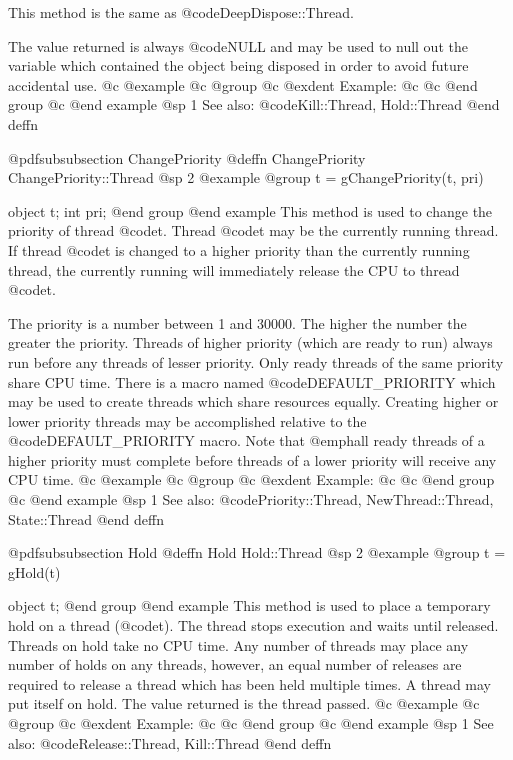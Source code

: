 This method is the same as @code{DeepDispose::Thread}.

The value returned is always @code{NULL} and may be used to null out
the variable which contained the object being disposed in order to
avoid future accidental use.
@c @example
@c @group
@c @exdent Example:
@c 
@c @end group
@c @end example
@sp 1
See also:  @code{Kill::Thread, Hold::Thread}
@end deffn













@pdfsubsubsection {ChangePriority}
@deffn {ChangePriority} ChangePriority::Thread
@sp 2
@example
@group
t = gChangePriority(t, pri)

object  t;
int     pri;
@end group
@end example
This method is used to change the priority of thread @code{t}.
Thread @code{t} may be the currently running thread.  If thread
@code{t} is changed to a higher priority than the currently running
thread, the currently running will immediately release the CPU to thread
@code{t}.

The priority is a number between 1 and 30000.  The higher the number the
greater the priority.  Threads of higher priority (which are ready to
run) always run before any threads of lesser priority.  Only ready
threads of the same priority share CPU time.  There is a macro named
@code{DEFAULT_PRIORITY} which may be used to create threads which share
resources equally.  Creating higher or lower priority threads may be
accomplished relative to the @code{DEFAULT_PRIORITY} macro.  Note that
@emph{all} ready threads of a higher priority must complete before
threads of a lower priority will receive any CPU time.
@c @example
@c @group
@c @exdent Example:
@c 
@c @end group
@c @end example
@sp 1
See also:  @code{Priority::Thread, NewThread::Thread, State::Thread}
@end deffn











@pdfsubsubsection {Hold}
@deffn {Hold} Hold::Thread
@sp 2
@example
@group
t = gHold(t)

object  t;
@end group
@end example
This method is used to place a temporary hold on a thread (@code{t}).
The thread stops execution and waits until released.  Threads on hold
take no CPU time.  Any number of threads may place any number of holds
on any threads, however, an equal number of releases are required
to release a thread which has been held multiple times.  A thread
may put itself on hold.  The value returned is the thread passed.
@c @example
@c @group
@c @exdent Example:
@c 
@c @end group
@c @end example
@sp 1
See also:  @code{Release::Thread, Kill::Thread}
@end deffn











